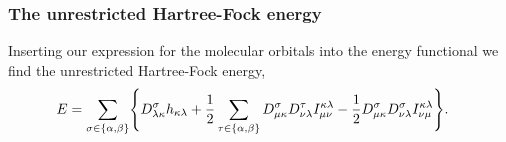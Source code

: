             \subsubsection{The unrestricted Hartree-Fock energy}
                Inserting our expression for the molecular orbitals into the
                energy functional we find the unrestricted Hartree-Fock energy,
                \begin{align}
                    E
                    &=
                    \sum_{\sigma \in \left\{ \alpha, \beta \right\}}
                    \Biggl\{
                        D^{\sigma}_{\lambda\kappa}
                        h_{\kappa\lambda}
                        + \frac{1}{2}
                        \sum_{\tau \in \left\{ \alpha, \beta \right\}}
                        D^{\sigma}_{\mu\kappa}
                        D^{\tau}_{\nu\lambda}
                        I^{\kappa\lambda}_{\mu\nu}
                        - \frac{1}{2}
                        D^{\sigma}_{\mu\kappa}
                        D^{\sigma}_{\nu\lambda}
                        I^{\kappa\lambda}_{\nu\mu}
                    \Biggr\}.
                \end{align}


